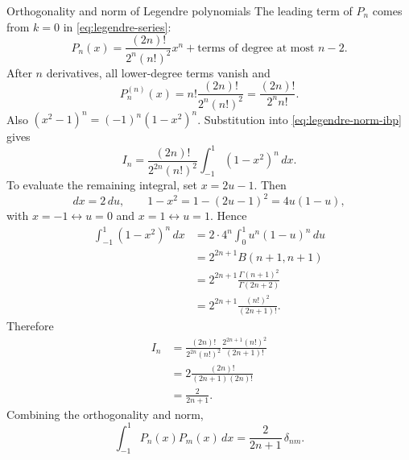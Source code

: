 \documentclass[11pt]{beamer}
\begin{document}
\begin{frame}[allowframebreaks]{Orthogonality and norm of Legendre polynomials}
The leading term of $P_n$ comes from $k=0$ in \eqref{eq:legendre-series}:
\[
  P_n(x)=\frac{(2n)!}{2^n(n!)^2}x^n+\text{terms of degree at most }n-2.
\]
After $n$ derivatives, all lower-degree terms vanish and
\[
  P_n^{(n)}(x)
  =n!\frac{(2n)!}{2^n(n!)^2}
  =\frac{(2n)!}{2^n n!}.
\]
Also $(x^2-1)^n=(-1)^n(1-x^2)^n$. Substitution into
\eqref{eq:legendre-norm-ibp} gives
\[
  I_n=\frac{(2n)!}{2^{2n}(n!)^2}
  \int_{-1}^{1}(1-x^2)^n\,dx.
\]
To evaluate the remaining integral, set $x=2u-1$. Then
\[
  dx=2\,du,
  \qquad
  1-x^2=1-(2u-1)^2=4u(1-u),
\]
with $x=-1\leftrightarrow u=0$ and $x=1\leftrightarrow u=1$. Hence
\begin{align*}
  \int_{-1}^{1}(1-x^2)^n\,dx
  &=2\cdot4^n\int_0^1u^n(1-u)^n\,du\\
  &=2^{2n+1}B(n+1,n+1)\\
  &=2^{2n+1}\frac{\Gamma(n+1)^2}{\Gamma(2n+2)}\\
  &=2^{2n+1}\frac{(n!)^2}{(2n+1)!}.
\end{align*}
Therefore
\begin{align*}
  I_n
  &=\frac{(2n)!}{2^{2n}(n!)^2}
    \frac{2^{2n+1}(n!)^2}{(2n+1)!}\\
  &=2\frac{(2n)!}{(2n+1)(2n)!}\\
  &=\frac{2}{2n+1}.
\end{align*}
Combining the orthogonality and norm,
\begin{equation}
  \int_{-1}^{1}P_n(x)P_m(x)\,dx
  =\frac{2}{2n+1}\,\delta_{nm}.
  \label{eq:legendre-orthogonality-full}
\end{equation}
\end{frame}
\end{document}
